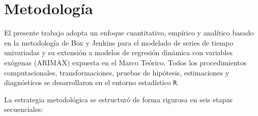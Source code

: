 \documentclass[11pt,letterpaper]{article}
\begin{document}
\section{Metodología}

El presente trabajo adopta un enfoque cuantitativo, empírico y analítico basado en la metodología de Box y Jenkins para el modelado de series de tiempo univariadas y su extensión a modelos de regresión dinámica con variables exógenas (ARIMAX) expuesta en el Marco Teórico. Todos los procedimientos computacionales, transformaciones, pruebas de hipótesis, estimaciones y diagnósticos se desarrollaron en el entorno estadístico \texttt{R}.

La estrategia metodológica se estructuró de forma rigurosa en seis etapas secuenciales:
\end{document}

